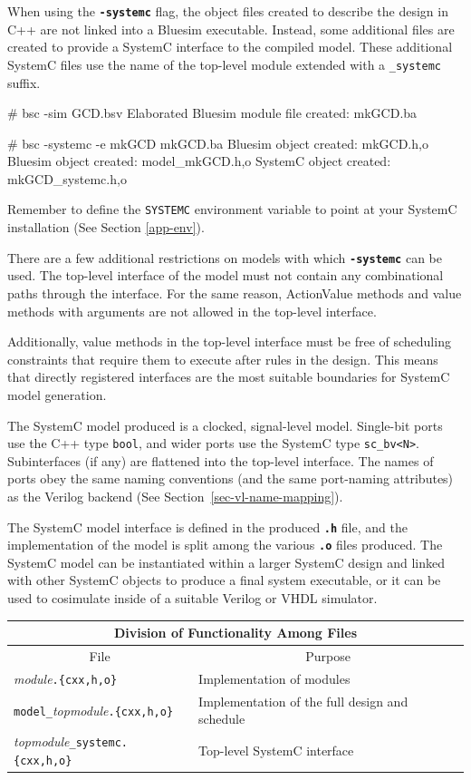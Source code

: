 \documentclass{article}
\newcommand{\te}[1]{\texttt{#1}}
\newenvironment{centerboxverbatim}
  {\center
   \boxedverbatim}
  {\endboxedverbatim
  {\endcenter }}
\begin{document}
When using the {\bf\tt -systemc} flag, the object files created to
describe the design in C++ are not linked into a Bluesim executable.
Instead, some additional files are created to provide a SystemC
interface to the compiled model.  These additional SystemC files use
the name of the top-level module extended with a \te{\_systemc} suffix.

\begin{centerboxverbatim}
# bsc -sim GCD.bsv
Elaborated Bluesim module file created: mkGCD.ba

# bsc -systemc -e mkGCD mkGCD.ba
Bluesim object created: mkGCD.{h,o}
Bluesim object created: model_mkGCD.{h,o}
SystemC object created: mkGCD_systemc.{h,o}
\end{centerboxverbatim}

Remember to define the \te{SYSTEMC} environment variable to point at
your SystemC installation (See Section \ref{app-env}).

There are a few additional restrictions on models with which
{\bf\tt -systemc} can be used.  The top-level interface of the model
must not contain any combinational paths through the interface.  For
the same reason, ActionValue methods and value methods with arguments
are not allowed in the top-level interface.

Additionally, value methods in the top-level interface must be free
of scheduling constraints that require them to execute after rules
in the design.  This means that directly registered interfaces are the
most suitable boundaries for SystemC model generation.

The SystemC model produced is a clocked, signal-level model.
Single-bit ports use the C++ type {\tt bool}, and wider ports use the
SystemC type {\tt sc\_bv<N>}.  Subinterfaces (if any) are flattened
into the top-level interface.  The names of ports obey the same naming
conventions (and the same port-naming attributes) as the Verilog backend
(See Section~\ref{sec-vl-name-mapping}).

The SystemC model interface is defined in the produced {\bf\tt .h}
file, and the implementation of the model is split among the various
{\bf\tt .o} files produced.  The SystemC model can be instantiated
within a larger SystemC design and linked with other SystemC objects
to produce a final system executable, or it can be used to cosimulate
inside of a suitable Verilog or VHDL simulator.

\begin{center}
\begin{tabular}{|l|l|}
\hline
\multicolumn{2}{|c|}{Division of Functionality Among Files} \\
\hline
\multicolumn{1}{|c|}{File} & \multicolumn{1}{|c|}{Purpose} \\
\hline
{\em module}\te{.\{cxx,h,o\}} & Implementation of modules \\
\te{model\_}{\em topmodule}\te{.\{cxx,h,o\}} & Implementation of the full design and schedule \\
{\em topmodule}\te{\_systemc.\{cxx,h,o\}} & Top-level SystemC interface \\
\hline
\end{tabular}
\end{center}
\end{document}
